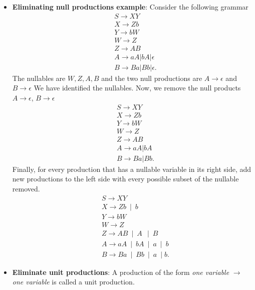 \documentclass{report}
\begin{document}
\begin{itemize}
\begin{enumerate}
            \end{enumerate}
        \item \textbf{Eliminating null productions example}: Consider the following grammar
            \begin{align*}
                &S \to XY \\
                &X \to Zb \\
                &Y \to bW \\
                &W \to Z \\
                &Z \to AB \\
                &A \to aA | bA | \epsilon \\
                &B \to Ba | Bb | \epsilon
            .\end{align*}
            The nullables are $W,Z,A,B$ and the two null productions are $A\to \epsilon$ and $B\to \epsilon$
            \bigbreak \noindent 
            We have identified the nullables. Now, we remove the null products $A\to \epsilon$, $B\to \epsilon$
            \begin{align*}
                &S \to XY \\
                &X \to Zb \\
                &Y \to bW \\
                &W \to Z \\
                &Z \to AB \\
                &A \to aA | bA \\
                &B \to Ba | Bb 
            .\end{align*}
            \bigbreak \noindent 
            Finally, for every production that has a nullable variable in its right side, add new productions to the left side with every possible subset of the nullable removed.
            \begin{align*}
                 &S \to XY \\
                &X \to Zb \ \mid \ b \\
                &Y \to bW \\
                &W \to Z \\
                &Z \to AB \ \mid \ A \ \ \mid \ B\\
                &A \to aA \ \mid \ bA \ \mid \ a \ \mid \ b \\
                &B \to Ba \ \mid \ Bb \ \mid \ a \ \mid b
            .\end{align*}
        \item \textbf{Eliminate unit productions}: A production of the form \textit{one variable} $\to$ \textit{one variable} is called a unit production.

\end{itemize}
\end{document}
